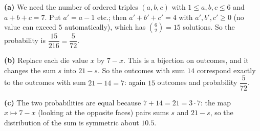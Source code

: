 \textbf{(a)} We need the number of ordered triples $(a,b,c)$ with $1\le a,b,c\le6$ and $a+b+c=7$. Put $a'=a-1$ etc.; then $a'+b'+c'=4$ with $a',b',c'\ge0$ (no value can exceed $5$ automatically), which has $\binom{6}{2}=15$ solutions. So the probability is $\dfrac{15}{216}=\boxed{\dfrac{5}{72}}$.

\textbf{(b)} Replace each die value $x$ by $7-x$. This is a bijection on outcomes, and it changes the sum $s$ into $21-s$. So the outcomes with sum $14$ correspond exactly to the outcomes with sum $21-14=7$: again $15$ outcomes and probability $\boxed{\dfrac{5}{72}}$.

\textbf{(c)} The two probabilities are equal because $7+14=21=3\cdot7$: the map $x\mapsto7-x$ (looking at the opposite faces) pairs sums $s$ and $21-s$, so the distribution of the sum is symmetric about $10.5$.
